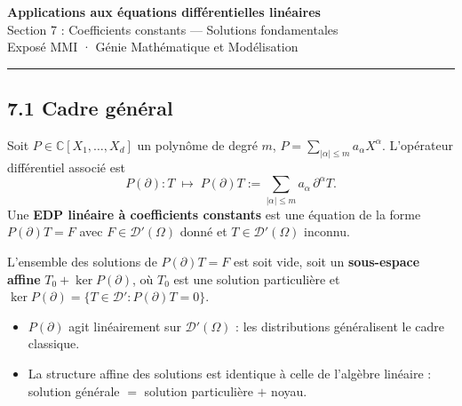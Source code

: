 \documentclass[12pt,a4paper]{article}
\newenvironment{notion}[1]{%
  \begin{tcolorbox}[enhanced, breakable,
    colback=GrisTresClair, colframe=GrisFonce,
    fonttitle=\bfseries\sffamily, title={Définition — #1},
    left=6pt, right=6pt, top=4pt, bottom=4pt, arc=3pt]
}{%
  \end{tcolorbox}}
\newenvironment{attention}{%
  \begin{tcolorbox}[enhanced, breakable,
    colback=white, colframe=black,
    fonttitle=\bfseries\sffamily, title={À retenir},
    borderline west={2pt}{0pt}{black}, frame hidden,
    left=10pt, right=6pt, top=4pt, bottom=4pt]
}{%
  \end{tcolorbox}}
\newcommand{\C}{\mathbb{C}}
\begin{document}

\begin{center}
  {\LARGE\bfseries\sffamily Applications aux équations différentielles linéaires}\\[0.4em]
  {\large\sffamily Section 7 : Coefficients constants — Solutions fondamentales}\\[0.8em]
  {\sffamily\color{GrisMoyen}Exposé MMI · Génie Mathématique et Modélisation}
\end{center}
\vspace{0.3em}\hrule height 0.5pt\vspace{1.2em}


\subsection*{7.1 \quad Cadre général}

\begin{notion}{Opérateur différentiel à coefficients constants}
Soit $P \in \C[X_1,\ldots,X_d]$ un polynôme de degré $m$,
$P = \sum_{|\alpha|\leq m} a_\alpha X^\alpha$.
L'opérateur différentiel associé est
\[
  P(\partial) : T \;\longmapsto\; P(\partial)T
  := \sum_{|\alpha|\leq m} a_\alpha\,\partial^\alpha T.
\]
Une \textbf{EDP linéaire à coefficients constants} est une équation de la forme
$P(\partial)T = F$ avec $F \in \mathcal{D}'(\Omega)$ donné et
$T \in \mathcal{D}'(\Omega)$ inconnu.
\end{notion}

\begin{tcolorbox}[enhanced, breakable,
  colback=white, colframe=GrisFonce,
  fonttitle=\bfseries\sffamily,
  title={Proposition — Structure de l'ensemble des solutions},
  borderline west={3pt}{0pt}{GrisFonce}, frame hidden,
  left=10pt, right=6pt, top=4pt, bottom=4pt]
L'ensemble des solutions de $P(\partial)T = F$ est soit vide, soit un
\textbf{sous-espace affine} $T_0 + \ker P(\partial)$, où $T_0$ est une solution
particulière et $\ker P(\partial) = \{T \in \mathcal{D}' : P(\partial)T = 0\}$.
\end{tcolorbox}

\begin{attention}
\begin{itemize}[itemsep=4pt]
  \item $P(\partial)$ agit linéairement sur $\mathcal{D}'(\Omega)$ : les distributions
        généralisent le cadre classique.
  \item La structure affine des solutions est identique à celle de l'algèbre linéaire :
        solution générale $=$ solution particulière $+$ noyau.
\end{itemize}
\end{attention}
\end{document}
